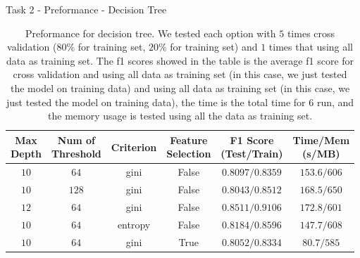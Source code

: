 \documentclass{beamer}
\begin{document}
\begin{frame}{Task 2 - Preformance - Decision Tree}

  \begin{table}[H]
    \centering
    \begin{tabular}{|c|c|c|c|c|c|}
      \hline
      \makecell{Max                                                  \\Depth} & \makecell{Num of                                                          \\ Threshold} & Criterion & \makecell{Feature \\ Selection}& \makecell{F1 Score \\ (Test/Train)} & \makecell{Time/Mem \\ (s/MB)}               \\
      \hline
      $10$ & $64$  & gini    & False & $0.8097/0.8359$ & $153.6/606$ \\
      \hline
      $10$ & $128$ & gini    & False & $0.8043/0.8512$ & $168.5/650$ \\
      \hline
      $12$ & $64$  & gini    & False & $0.8511/0.9106$ & $172.8/601$ \\
      \hline
      $10$ & $64$  & entropy & False & $0.8184/0.8596$ & $147.7/608$ \\
      \hline
      $10$ & $64$  & gini    & True  & $0.8052/0.8334$ & $80.7/585$  \\
      \hline
    \end{tabular}
    \caption{Preformance for decision tree. We tested each option with $5$ times cross validation ($80\%$ for training set, $20\%$ for training set) and $1$ times that using all data as training set. The f1 scores showed in the table is the average f1 score for cross validation and using all data as training set (in this case, we just tested the model on training data) and using all data as training set (in this case, we just tested the model on training data), the time is the total time for $6$ run, and the memory usage is tested using all the data as training set.}
  \end{table}

\end{frame}
\end{document}
